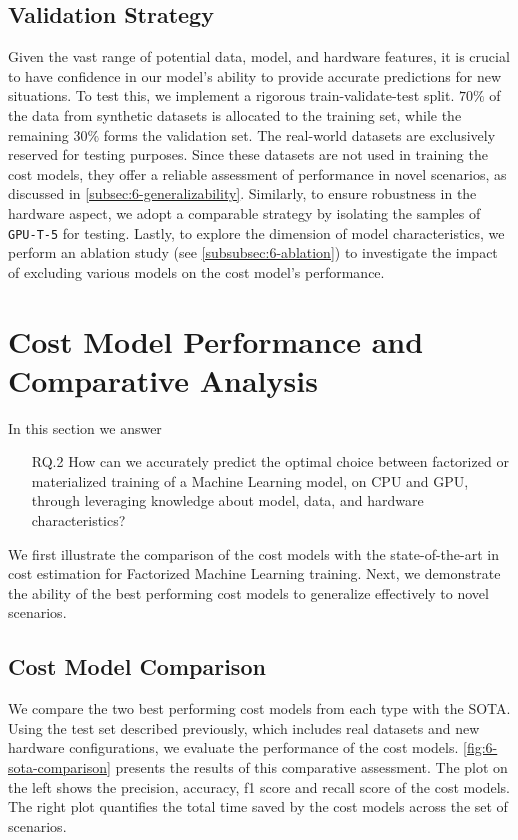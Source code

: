 \subsection{Validation Strategy}
\label{subsec:6-validation-strategy}
Given the vast range of potential data, model, and hardware features, it is crucial to have confidence in our model's ability to provide accurate predictions for new situations. To test this, we implement a rigorous train-validate-test split. $70\%$ of the data from synthetic datasets is allocated to the training set, while the remaining $30\%$ forms the validation set. The real-world datasets are exclusively reserved for testing purposes. Since these datasets are not used in training the cost models, they offer a reliable assessment of performance in novel scenarios, as discussed in \autoref{subsec:6-generalizability}. Similarly, to ensure robustness in the hardware aspect, we adopt a comparable strategy by isolating the samples of \texttt{GPU-T-5} for testing. Lastly, to explore the dimension of model characteristics, we perform an ablation study (see \autoref{subsubsec:6-ablation}) to investigate the impact of excluding various models on the cost model's performance.

\section{Cost Model Performance and Comparative Analysis}
\label{sec:eval-model-evaluation}

In this section we answer
\begin{itemize}
    \item[RQ.2] How can we accurately predict the optimal choice between factorized or materialized training of a Machine Learning model, on CPU and GPU, through leveraging knowledge about model, data, and hardware characteristics?
\end{itemize}

We first illustrate the comparison of the cost models with the state-of-the-art in cost estimation for Factorized Machine Learning training. Next, we demonstrate the ability of the best performing cost models to generalize effectively to novel scenarios.

\subsection{Cost Model Comparison}
\label{subsec:6-sota-comparison}
We compare the two best performing cost models from each type with the SOTA. Using the test set described previously, which includes real datasets and new hardware configurations, we evaluate the performance of the cost models. \autoref{fig:6-sota-comparison} presents the results of this comparative assessment. The plot on the left shows the precision, accuracy, f1 score and recall score of the cost models. The right plot quantifies the total time saved by the cost models across the set of scenarios.

